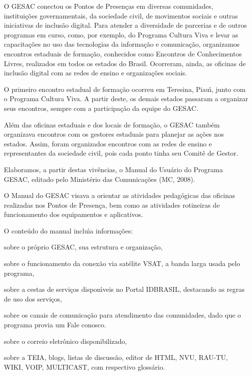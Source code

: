 \documentclass[
12pt,		%
openright,	%
twoside,  %
a4paper,			%
chapter=TITLE,		%
english,			%
french,				%
spanish,			%
brazil				%
]{USPSC-classe/USPSC}
\begin{document}
O GESAC conectou os Pontos de Presen\c{c}as em diversas comunidades, institui\c{c}\~oes governamentais, da sociedade civil, de movimentos sociais e outras iniciativas de inclus\~ao digital. Para  atender a diversidade de parcerias  e de outros programas em curso, como, por exemplo, do Programa Cultura Viva e levar as  capacita\c{c}\~oes no uso das tecnologias da informa\c{c}\~ao e comunica\c{c}\~ao, organizamos encontros estaduais de forma\c{c}\~ao, conhecidos como Encontros de Conhecimentos Livres, realizados em todos os estados do Brasil. Ocorreram, ainda, as  oficinas de inclus\~ao digital com as redes de ensino e organiza\c{c}\~oes sociais.




O primeiro encontro estadual de forma\c{c}\~ao ocorreu em  Teresina, Piau\'{\i}, junto com o Programa Cultura Viva. A partir deste, os demais estados passaram a organizar seus encontros, sempre com a participa\c{c}\~ao da equipe do GESAC.




Al\'em das oficinas estaduais e dos locais de forma\c{c}\~ao, o GESAC tamb\'em organizava encontros com os gestores estaduais para planejar as a\c{c}\~oes nos estados. Assim, foram organizados encontros com as redes de ensino e  representantes da sociedade civil, pois cada ponto  tinha seu Comit\^e de Gestor.




Elaboramos, a partir destas viv\^encias, o Manual do Usu\'ario do Programa GESAC, editado pelo Minist\'erio das Comunica\c{c}\~oes (MC, 2008).




O Manual do GESAC visava a orientar as atividades pedag\'ogicas das oficinas realizadas nos Pontos de Presen\c{c}a, bem como as  atividades rotineiras de funcionamento dos equipamentos e aplicativos.




O conte\'udo do manual inclu\'{\i}a informa\c{c}\~oes:





\begin{alineas}
\item sobre o pr\'oprio GESAC, sua estrutura e organiza\c{c}\~ao,
\item sobre o funcionamento da conex\~ao via sat\'elite VSAT, a banda larga usada pelo programa,
\item sobre a cestas de servi\c{c}os dispon\'{\i}veis no Portal IDBRASIL, destacando as regras de uso dos servi\c{c}os,
\item sobre os canais de comunica\c{c}\~ao para atendimento das comunidades, dado que o programa provia um \textquotedbl Fale conosco\textquotedbl .
\item sobre o correio eletr\^onico disponibilizado,
\item sobre a TEIA, blogs, listas de discuss\~ao, editor de HTML, NVU, RAU-TU, WIKI, VOIP, MULTICAST, com respectivo gloss\'ario.
\end{alineas}
\end{document}
